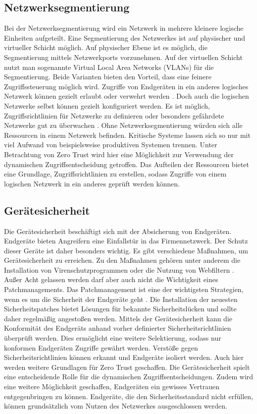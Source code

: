 \documentclass[lettersize,journal]{IEEEtran}
\begin{document}
\subsection{Netzwerksegmentierung}
Bei der Netzwerksegmentierung wird ein Netzwerk in mehrere kleinere logische Einheiten aufgeteilt. Eine Segmentierung des Netzwerkes ist auf physischer und virtueller Schicht möglich. Auf physischer Ebene ist es möglich, die Segmentierung mittels Netzwerkports vorzunehmen. Auf der virtuellen Schicht nutzt man sogenannte Virtual Local Area Networks (VLANs) für die Segmentierung. Beide Varianten bieten den Vorteil, dass eine feinere Zugriffssteuerung möglich wird. Zugriffe von Endgeräten in ein anderes logisches Netzwerk können gezielt erlaubt oder verwehrt werden \cite{gerling2022sicherheit}. Doch auch die logischen Netzwerke selbst können gezielt konfiguriert werden. Es ist möglich, Zugriffsrichtlinien für Netzwerke zu definieren oder besonders gefährdete Netzwerke gut zu überwachen \cite{Oelmaier_Knebelsberger_Naefe_2023}. Ohne Netzwerksegmentierung würden sich alle Ressourcen in einem Netzwerk befinden. Kritische Systeme lassen sich so nur mit viel Aufwand von beispielsweise produktiven Systemen trennen. Unter Betrachtung von Zero Trust wird hier eine Möglichkeit zur Verwendung der dynamischen Zugriffsentscheidung getroffen. Das Aufteilen der Ressourcen bietet eine Grundlage, Zugriffsrichtlinien zu erstellen, sodass Zugriffe von einem logischen Netzwerk in ein anderes geprüft werden können.

\subsection{Gerätesicherheit}
Die Gerätesicherheit beschäftigt sich mit der Absicherung von Endgeräten. Endgeräte bieten Angreifern eine Einfallstür in das Firmennetzwerk. Der Schutz dieser Geräte ist daher besonders wichtig. Es gibt verschiedene Maßnahmen, um Gerätesicherheit zu erreichen. Zu den Maßnahmen gehören unter anderem die Installation von Virenschutzprogrammen oder die Nutzung von Webfiltern \cite{9998470}. Außer Acht gelassen werden darf aber auch nicht die Wichtigkeit eines Patchmanagements. Das Patchmanagement ist eine der wichtigsten Strategien, wenn es um die Sicherheit der Endgeräte geht \cite{Froehlich_2020}. Die Installation der neuesten Sicherheitspatches bietet Lösungen für bekannte Sicherheitslücken und sollte daher regelmäßig angestoßen werden. Mittels der Gerätesicherheit kann die Konformität des Endgeräts anhand vorher definierter Sicherheitsrichtlinien überprüft werden. Dies ermöglicht eine weitere Selektierung, sodass nur konformen Endgeräten Zugriffe gewährt werden. Verstöße gegen Sicherheitsrichtlinien können erkannt und Endgeräte isoliert werden. Auch hier werden weitere Grundlagen für Zero Trust geschaffen. Die Gerätesicherheit spielt eine entscheidende Rolle für die dynamischen Zugriffsentscheidungen. Zudem wird eine weitere Möglichkeit geschaffen, Endgeräten ein gewisses Vertrauen entgegenbringen zu können. Endgeräte, die den Sicherheitsstandard nicht erfüllen, können grundsätzlich vom Nutzen des Netzwerkes ausgeschlossen werden.
\end{document}
